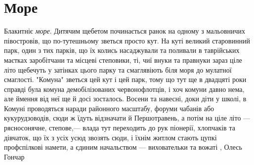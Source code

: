  
 
 
 
 
\chapter{Море}
\label{sec:slova.more}

Блакитніє \emph{море}. Дитячим щебетом починається ранок на одному з мальовничих
півостровів, що по-тутешньому зветься просто кут. На куті великий старовинний
парк, один з тих парків, що їх колись насаджували та поливали в таврійських
маєтках заробітчани та місцеві степовики, ті, чиї внуки та правнуки зараз ціле
літо щебечуть у затінках цього парку та смаглявіють біля моря до мулатної
смаглості. "Комуна" зветься цей кут і цей парк, тому що тут ще в двадцяті роки
справді була комуна демобілізованих червонофлотців, і хоч комуни давно нема,
але ймення від неї ще й досі зосталось. Восени та навесні, доки діти у школі, в
Комуні проводяться наради районного масштабу, форуми чабанів або
кукурудзоводів, сюди ж їдуть відзначати й Першотравень, а потім на ціле літо —
рясносонячне, степове,— влада тут переходить до рук піонерії, хлопчаків та
дівчаток, що їх з усіх усюд звозять сюди, і їхнім житлом стають цупкі
профспілкові намети, а єдиним начальством — виховательки та вожаті
, Олесь Гончар
